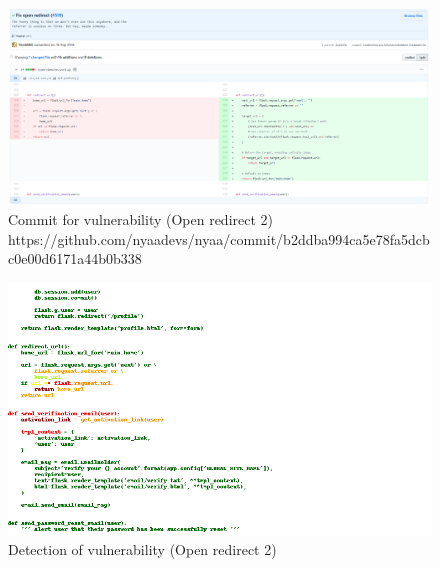 \documentclass[
a4paper,
pagesize,
pdftex,
12pt,
twoside, %
BCOR=5mm, %
ngerman,
fleqn,
final,
]{scrartcl}
\begin{document}
	\begin{figure}[H]
		\centering
		\includegraphics[width=\linewidth]{Images/open_redirectB}
		\caption{Commit for vulnerability (Open redirect 2) \newline \scriptsize{
				https://github.com/nyaadevs/nyaa/commit/b2ddba994ca5e78fa5dcbc0e00d6171a44b0b338}}
		\label{fig:open_redirectB}
	\end{figure}
	\begin{figure}[H]
		\centering
		\includegraphics[width=\linewidth]{Images/open_redirectBr}
		\caption{Detection of vulnerability (Open redirect 2)}
		\label{fig:open_redirectBr}
	\end{figure}
	
\end{document}
